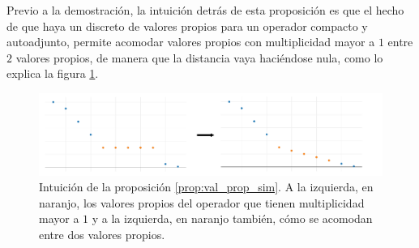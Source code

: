 Previo a la demostración, la intuición detrás de esta proposición es que el hecho de que haya un discreto de valores propios para un operador compacto y autoadjunto, permite acomodar valores propios con multiplicidad mayor a $1$ entre $2$ valores propios, de manera que la distancia vaya haciéndose nula, como lo explica la figura \ref{fig:simple_eig_vals}.

\begin{figure}[h!]
    \centering
    \includegraphics[width=1.0\linewidth]{img/content/chapter3/simple_eig_vals.pdf}
    \caption{Intuición de la proposición \ref{prop:val_prop_sim}. A la izquierda, en naranjo, los valores propios del operador que tienen multiplicidad mayor a $1$ y a la izquierda, en naranjo también, cómo se acomodan entre dos valores propios.}
    \label{fig:simple_eig_vals}
\end{figure}

